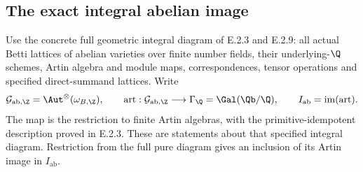 \subsection{The exact integral abelian image}

Use the concrete full geometric integral diagram of E.2.3 and
E.2.9: all actual Betti lattices of abelian varieties over finite
number fields, their underlying-\(\Q\) schemes, Artin algebra
and module maps, correspondences, tensor operations and specified
direct-summand lattices. Write
\[
 \mathcal G_{\mathrm{ab},\Z}
   =\Aut^\otimes(\omega_{B,\Z}),\qquad
 \operatorname{art}:\mathcal G_{\mathrm{ab},\Z}\longrightarrow
       \Gamma_{\Q}=\Gal(\Qb/\Q),\qquad
 I_{\mathrm{ab}}=\operatorname{im}(\operatorname{art}).
\]
The map is the restriction to finite Artin algebras, with the
primitive-idempotent description proved in E.2.3.
These are statements about that specified integral diagram.
Restriction from the full pure diagram gives an inclusion of its
Artin image in \(I_{\mathrm{ab}}\).

